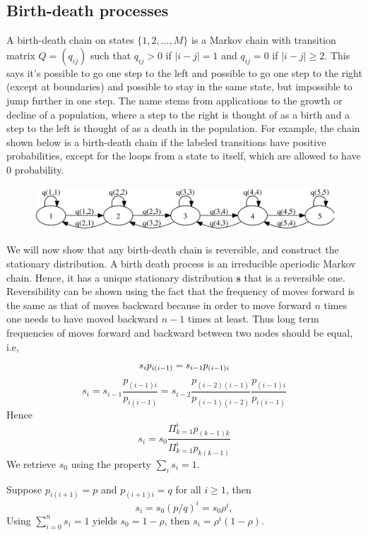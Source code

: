 \documentclass[12pt,a4paper]{article}
\begin{document}
\subsection{Birth-death processes}
A birth-death chain on states $\{1,2,\ldots,M\}$
is a Markov chain with transition matrix $Q = (q_{ij})$ such that $q_{ij} > 0$ if $|i - j| = 1$
and $q_{ij} = 0$ if $|i - j| \geq 2$. 
This says it's possible to go one step to the left and possible to go one step to the right (except at boundaries) and possible to stay in the same state, but impossible to jump further in one step. 
The name stems from applications to the growth or decline of
a population, where a step to the right is thought of as a birth and a step to the left is thought of as a death in the population.
For example, the chain shown below is a birth-death chain if the labeled transitions have positive probabilities, except for the loops from a state to itself, which are allowed to have $0$ probability.
\begin{figure}
	\begin{center}
		\includegraphics[width =.7\textwidth]{images/birth_death.png}
	\end{center}
\end{figure}
We will now show that any birth-death chain is reversible, and construct the stationary distribution.
A birth death process is an irreducible aperiodic Markov chain. Hence, it has a unique stationary distribution $\bm s$ that is a reversible one.
Reversibility can be shown using the fact that the frequency of moves forward is the same as that of moves backward because in order to move forward $n$ times one needs to have moved backward $n-1$ times at least. Thus long term frequencies of moves forward and backward between two nodes should be equal, i.e,
$$
s_i p_{i(i-1)} = s_{i-1} p_{(i-1)i}\\
$$
$$
s_i = s_{i-1}\frac{ p_{(i-1)i}}{p_{i(i-1)}}
=  s_{i-2} \frac{p_{(i-2)(i-1)}}{p_{(i-1)(i-2)}} \frac{p_{(i-1)i}}{p_{i(i-1)}}
$$
Hence
$$
s_i = s_0\frac{\Pi_{k=1}^{i}p_{(k-1)k}}{\Pi_{k=1}^{i}p_{k(k-1)}}
$$
We retrieve $s_0$ using the property $\sum_i s_i = 1$.

Suppose $p_{i(i+1)}=p$ and $p_{(i+1)i}=q$ for all $i\geq 1$, then 
$$
s_i =s_0 (p/q)^i = s_0 \rho^i,
$$
Using $\sum_{i=0}^n s_i = 1$ yields $s_0 = {1-\rho}$, then $s_i = \rho^i(1-\rho)$.
\end{document}
